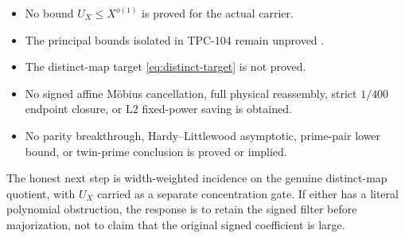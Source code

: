 \documentclass[11pt]{article}
\theoremstyle{definition}
\theoremstyle{remark}
\newcommand{\Ltwo}{\mathrm{L2}}
\begin{document}
\begin{itemize}[leftmargin=2em]
\item No bound \(U_X\le X^{o(1)}\) is proved for the actual carrier.
\item The principal bounds isolated in TPC-104 remain unproved
\citep{WangTPC104}.
\item The distinct-map target \eqref{eq:distinct-target} is not
proved.
\item No signed affine M\"obius cancellation, full physical
reassembly, strict \(1/400\) endpoint closure, or \(\Ltwo\)
fixed-power saving is obtained.
\item No parity breakthrough, Hardy--Littlewood asymptotic,
prime-pair lower bound, or twin-prime conclusion is proved or
implied.
\end{itemize}

The honest next step is width-weighted incidence on the genuine
distinct-map quotient, with \(U_X\) carried as a separate
concentration gate.  If either has a literal polynomial obstruction,
the response is to retain the signed filter before majorization,
not to claim that the original signed coefficient is large.

\begingroup
\scriptsize
\setlength{\bibsep}{1pt}
\raggedright


\endgroup
\end{document}
